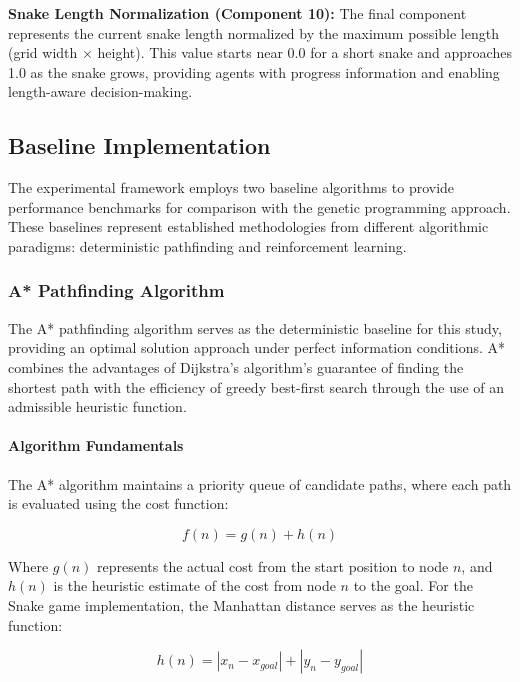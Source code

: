 \documentclass[a4paper,12pt]{article}
\begin{document}
\textbf{Snake Length Normalization (Component 10):} The final component represents the current snake length normalized by the maximum possible length (grid width × height). This value starts near 0.0 for a short snake and approaches 1.0 as the snake grows, providing agents with progress information and enabling length-aware decision-making.

\subsection{Baseline Implementation}

The experimental framework employs two baseline algorithms to provide performance benchmarks for comparison with the genetic programming approach. These baselines represent established methodologies from different algorithmic paradigms: deterministic pathfinding and reinforcement learning.

\subsubsection{A* Pathfinding Algorithm}

The A* pathfinding algorithm serves as the deterministic baseline for this study, providing an optimal solution approach under perfect information conditions. A* combines the advantages of Dijkstra's algorithm's guarantee of finding the shortest path with the efficiency of greedy best-first search through the use of an admissible heuristic function.

\paragraph{Algorithm Fundamentals}

The A* algorithm maintains a priority queue of candidate paths, where each path is evaluated using the cost function:

\begin{equation}
f(n) = g(n) + h(n)
\end{equation}

Where $g(n)$ represents the actual cost from the start position to node $n$, and $h(n)$ is the heuristic estimate of the cost from node $n$ to the goal. For the Snake game implementation, the Manhattan distance serves as the heuristic function:

\begin{equation}
h(n) = |x_n - x_{goal}| + |y_n - y_{goal}|
\end{equation}
\end{document}
